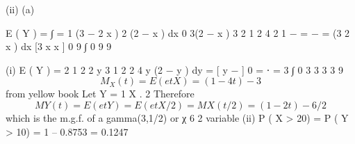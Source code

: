 \documentclass[a4paper,12pt]{article}
\begin{document}
(ii)
(a)

E ( Y ) = ∫
=
1 (3 − 2 x )
2
(2 − x ) dx
0 3(2 − x ) 3
2 1
2
4
2 1
−
=
−
=
(3
2
x
)
dx
[3
x
x
]
0
9 ∫ 0
9
9

(i)
E ( Y ) =
2 1
2 2 y 3 1 2 2 4
y
(2
−
y
)
dy
=
[ y − ] 0 = ⋅ =
3 ∫ 0
3
3
3 3 9
\[M_X ( t ) = E ( e tX ) = (1 − 4 t ) − 3\] from yellow book
Let Y =
1
X .
2
Therefore \[M Y ( t ) = E ( e tY ) = E ( e tX / 2 ) = M X ( t / 2) = (1 − 2 t ) − 6 / 2\]
which is the m.g.f. of a gamma(3,1/2) or χ 6 2 variable
(ii)
P ( X > 20) = P ( Y > 10)
= 1 – 0.8753 = 0.1247
\end{document}
